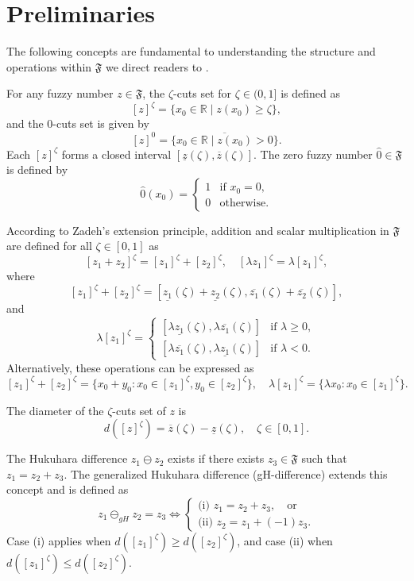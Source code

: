 \documentclass[reqno]{amsart}
\begin{document}
\section{Preliminaries}

 The following concepts are fundamental to understanding the structure and
 operations within $\mathfrak{F}$ we direct readers to \cite{bed}.
 
For any fuzzy number \( z \in \mathfrak{F} \), the \(\zeta\)-cuts set for
\(\zeta \in (0,1]\) is defined as
 \[
 [z]^\zeta = \{ x_0 \in \mathbb{R} \mid z(x_0) \geq \zeta \},
 \]
and the 0-cuts set is given by
\[
 [z]^0 = \overline{\{ x_0 \in \mathbb{R} \mid z(x_0) > 0 \}}.
\]
Each \([z]^\zeta\) forms a closed interval \([\underline{z}(\zeta), \overline{z}(\zeta)]\). The zero fuzzy number \(\hat{0} \in \mathfrak{F}\) is defined by
\[
 \hat{0}(x_0) = \begin{cases}
 1 & \text{if } x_0 = 0, \\
 0 & \text{otherwise}.
 \end{cases}
\]

According to Zadeh's extension principle, addition and scalar multiplication 
in $\mathfrak{F}$ are defined for all $\zeta \in [0,1]$ as
\[
 [z_1 + z_2]^\zeta = [z_1]^\zeta + [z_2]^\zeta, \quad 
 [\lambda z_1]^\zeta = \lambda [z_1]^\zeta,
\]
 where
\[
 [z_1]^\zeta + [z_2]^\zeta = [\underline{z_1}(\zeta) + \underline{z_2}(\zeta), \overline{z_1}(\zeta) + \overline{z_2}(\zeta)],
 \]
and
\begin{equation} \label{eq21}
 \lambda [z_1]^\zeta = \begin{cases}
 [\lambda \underline{z_1}(\zeta), \lambda \overline{z_1}(\zeta)]
 & \text{if }   \lambda \geq 0, \\
 [\lambda \overline{z_1}(\zeta), \lambda \underline{z_1}(\zeta)]
 & \text{if } \lambda < 0.
 \end{cases}
\end{equation}
 Alternatively, these operations can be expressed as
\[
 [z_1]^\zeta + [z_2]^\zeta = \{x_0 + y_0 : x_0 \in [z_1]^\zeta, y_0 \in [z_2]^\zeta\},
 \quad \lambda [z_1]^\zeta = \{\lambda x_0 : x_0 \in [z_1]^\zeta\}.
\]

 The diameter of the \(\zeta\)-cuts set of \(z\) is
 \[
 d([z]^\zeta) = \overline{z}(\zeta) - \underline{z}(\zeta), \quad \zeta \in [0,1].
 \]

The Hukuhara difference \(z_1 \ominus z_2\) exists if there exists
 \(z_3 \in \mathfrak{F}\) such that \(z_1 = z_2 + z_3\).
The generalized Hukuhara difference (gH-difference) extends this 
concept and is defined as
 \[\label{eq22}
 z_1 \ominus_{gH} z_2 = z_3 \Leftrightarrow
 \begin{cases}
 \text{(i) } z_1 = z_2 + z_3, \quad \text{or} \\
 \text{(ii) } z_2 = z_1 + (-1)z_3.
 \end{cases}\tag{2.2}
 \]
Case (i) applies when \(d([z_1]^\zeta) \geq d([z_2]^\zeta)\), and case (ii) when 
\(d([z_1]^\zeta) \leq d([z_2]^\zeta)\).
\end{document}
